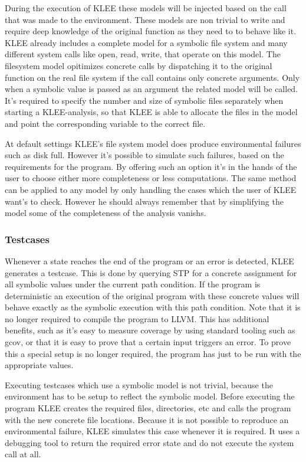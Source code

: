 During the execution of KLEE these models will be injected based on the call that was made to the environment. These models are non trivial to write and require deep knowledge of the original function as they need to to behave like it. KLEE already includes a complete model for a symbolic file system and many different system calls like open, read, write, that operate on this model.
The filesystem model opitimizes concrete calls by dispatching it to the original function on the real file system if the call contains only concrete arguments. Only when a symbolic value is passed as an argument the related model will be called. It's required to specify the number and size of symbolic files separately when starting a KLEE-analysis, so that KLEE is able to allocate the files in the model and point the corresponding variable to the correct file.

At default settings KLEE's file system model does produce environmental failures such as disk full. However it's possible to simulate such failures, based on the requirements for the program. By offering such an option it's in the hands of the user to choose either more completeness or less computations. The same method can be applied to any model by only handling the cases which the user of KLEE want's to check. However he should always remember that by simplifying the model some of the completeness of the analysis vanishs.

\subsubsection{Testcases}
Whenever a state reaches the end of the program or an error is detected, KLEE generates a testcase. This is done by querying STP for a concrete assignment for all symbolic values under the current path condition. If the program is deterministic an execution of the original program with these concrete values will behave exactly as the symbolic execution with this path condition.
Note that it is no longer required to compile the program to LLVM. This has additional benefits, such as it's easy to measure coverage by using standard tooling such as gcov, or that it is easy to prove that a certain input triggers an error. To prove this a special setup is no longer required, the program has just to be run with the appropriate values.

Executing testcases which use a symbolic model is not trivial, because the environment has to be setup to reflect the symbolic model. Before executing the program KLEE creates the required files, directories, etc and calls the program with the new concrete file locations. Because it is not possible to reproduce an environmental failure, KLEE simulates this case whenever it is required. It uses a debugging tool to return the required error state and do not execute the system call at all.

